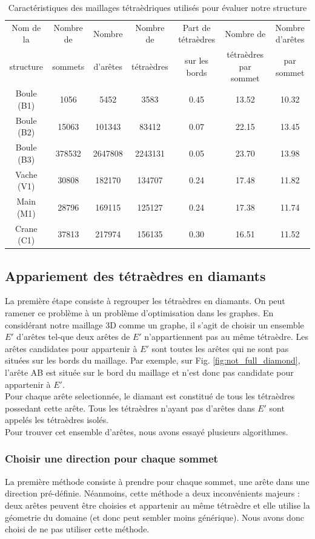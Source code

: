 \documentclass[a4paper,11pt,openany]{article}
\begin{document}
\begin{table}[H]
\footnotesize
\begin{tabular}{|c | c | c | c | c| c | c |}
\hline
Nom de la & Nombre de & Nombre& Nombre de & Part de tétraèdres & Nombre de & Nombre d'arêtes\\
structure&sommets&d'arêtes &tétraèdres&sur les bords&tétraèdres par sommet & par sommet\\
\hline
Boule (B1) & 1056 & 5452 & 3583 & 0.45 & 13.52 & 10.32 \\
Boule (B2)& 15063 & 101343 & 83412 & 0.07 & 22.15 & 13.45\\
Boule (B3)& 378532 & 2647808 & 2243131 & 0.05 & 23.70 & 13.98 \\
Vache (V1)& 30808 & 182170 & 134707 & 0.24 & 17.48 & 11.82 \\
Main (M1)& 28796 & 169115 & 125127 & 0.24 & 17.38 & 11.74\\
Crane (C1)& 37813 & 217974 & 156135 & 0.30 & 16.51 & 11.52 \\ 
\hline  
\end{tabular}
\label{Tab:results_performances}
\caption{Caractéristiques des maillages tétraèdriques utilisés pour évaluer notre structure}
\end{table}

\subsection{Appariement des tétraèdres en diamants}
\noindent
La première étape consiste à regrouper les tétraèdres en diamants. On peut ramener ce problème à un problème d'optimisation dans les graphes. En considérant notre maillage 3D comme un graphe, il s'agit de choisir un ensemble $E'$ d'arêtes tel-que deux arêtes de $E'$ n'appartiennent pas au même tétraèdre. Les arêtes candidates pour appartenir à $E'$ sont toutes les arêtes qui ne sont pas situées sur les bords du maillage. Par exemple, sur Fig. \ref{fig:not_full_diamond}, l'arête AB est située sur le bord du maillage et n'est donc pas candidate pour appartenir à $E'$.\\
Pour chaque arête selectionnée, le diamant est constitué de tous les tétraèdres possedant cette arête. Tous les tétraèdres n'ayant pas d'arêtes dans $E'$ sont appelés les tétraèdres isolés.\\
Pour trouver cet ensemble d'arêtes, nous avons essayé plusieurs algorithmes.
\subsubsection{Choisir une direction pour chaque sommet}
\noindent
La première méthode consiste à prendre pour chaque sommet, une arête dans une direction pré-définie. Néanmoins, cette méthode a deux inconvénients majeurs : deux arêtes peuvent être choisies et appartenir au même tétraèdre et elle utilise la géometrie du domaine (et donc peut sembler moins générique). Nous avons donc choisi de ne pas utiliser cette méthode.
\end{document}
